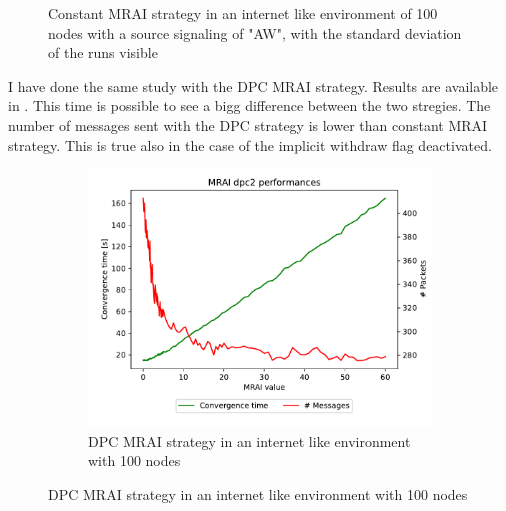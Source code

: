 \documentclass[10pt,conference,letterpaper]{IEEEtran}
\newcommand{\figwidth}{0.78}
\newcommand{\figvspace}{-1.5em}
\begin{document}
\begin{figure}[tb]
	\caption{Constant \ac{MRAI} strategy in an internet like environment of \num{100} nodes
			 with a source signaling of "AW", with the standard deviation of the runs visible}
	\label{fig:s_aw_constant_mrai_std}
	\vspace{\figvspace}
\end{figure}

I have done the same study with the \ac{DPC} \ac{MRAI} strategy.
Results are available in .
This time is possible to see a bigg difference between the two stregies.
The number of messages sent with the \ac{DPC} strategy is lower than 
constant \ac{MRAI} strategy.
This is true also in the case of the implicit withdraw flag deactivated.

\begin{figure}[tb]
	\centering

	\begin{subfigure}{\columnwidth}
		\centering
		\includegraphics[width=\figwidth\columnwidth]{images/internet_like/S_AW/graph-100-dpc/pareto-internet_like-DPC_mrai_evolution.pdf}
		\caption{\ac{DPC} \ac{MRAI} strategy in an internet like environment with \num{100} nodes}
		\label{fig:s_aw_dpc_mrai_IW}
		\qquad
	\end{subfigure}


\end{figure}
\end{document}
